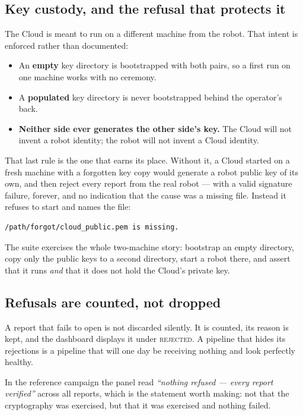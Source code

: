 \subsection{Key custody, and the refusal that protects it}

The Cloud is meant to run on a different machine from the robot. That
intent is enforced rather than documented:

\begin{itemize}[leftmargin=*,itemsep=1pt,topsep=2pt]
  \item An \textbf{empty} key directory is bootstrapped with both pairs,
        so a first run on one machine works with no ceremony.
  \item A \textbf{populated} key directory is never bootstrapped behind
        the operator's back.
  \item \textbf{Neither side ever generates the other side's key.} The
        Cloud will not invent a robot identity; the robot will not
        invent a Cloud identity.
\end{itemize}

That last rule is the one that earns its place. Without it, a Cloud
started on a fresh machine with a forgotten key copy would generate a
robot public key of its own, and then reject every report from the real
robot --- with a valid signature failure, forever, and no indication
that the cause was a missing file. Instead it refuses to start and names
the file:

\begin{lstlisting}[style=bash]
/path/forgot/cloud_public.pem is missing.
\end{lstlisting}

The suite exercises the whole two-machine story: bootstrap an empty
directory, copy only the public keys to a second directory, start a
robot there, and assert that it runs \emph{and} that it does not hold
the Cloud's private key.

\subsection{Refusals are counted, not dropped}

A report that fails to open is not discarded silently. It is counted,
its reason is kept, and the dashboard displays it under
\textsc{rejected}. A pipeline that hides its rejections is a pipeline
that will one day be receiving nothing and look perfectly healthy.

In the reference campaign the panel read \emph{``nothing refused ---
every report verified''} across all  reports, which is the
statement worth making: not that the cryptography was exercised, but
that it was exercised and nothing failed.
